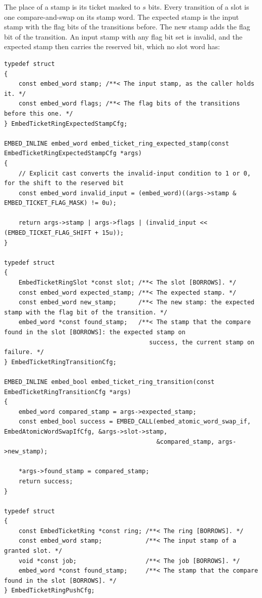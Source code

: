 The place of a stamp is its ticket masked to \(s\) bits. Every transition of a slot is one compare-and-swap on its stamp word. The expected stamp is the input stamp with the flag bits of the transitions before. The new stamp adds the flag bit of the transition. An input stamp with any flag bit set is invalid, and the expected stamp then carries the reserved bit, which no slot word has:

\begin{Verbatim}
typedef struct
{
    const embed_word stamp; /**< The input stamp, as the caller holds it. */
    const embed_word flags; /**< The flag bits of the transitions before this one. */
} EmbedTicketRingExpectedStampCfg;

EMBED_INLINE embed_word embed_ticket_ring_expected_stamp(const EmbedTicketRingExpectedStampCfg *args)
{
    // Explicit cast converts the invalid-input condition to 1 or 0, for the shift to the reserved bit
    const embed_word invalid_input = (embed_word)((args->stamp & EMBED_TICKET_FLAG_MASK) != 0u);

    return args->stamp | args->flags | (invalid_input << (EMBED_TICKET_FLAG_SHIFT + 15u));
}

typedef struct
{
    EmbedTicketRingSlot *const slot; /**< The slot [BORROWS]. */
    const embed_word expected_stamp; /**< The expected stamp. */
    const embed_word new_stamp;      /**< The new stamp: the expected stamp with the flag bit of the transition. */
    embed_word *const found_stamp;   /**< The stamp that the compare found in the slot [BORROWS]: the expected stamp on
                                        success, the current stamp on failure. */
} EmbedTicketRingTransitionCfg;

EMBED_INLINE embed_bool embed_ticket_ring_transition(const EmbedTicketRingTransitionCfg *args)
{
    embed_word compared_stamp = args->expected_stamp;
    const embed_bool success = EMBED_CALL(embed_atomic_word_swap_if, EmbedAtomicWordSwapIfCfg, &args->slot->stamp,
                                          &compared_stamp, args->new_stamp);

    *args->found_stamp = compared_stamp;
    return success;
}

typedef struct
{
    const EmbedTicketRing *const ring; /**< The ring [BORROWS]. */
    const embed_word stamp;            /**< The input stamp of a granted slot. */
    void *const job;                   /**< The job [BORROWS]. */
    embed_word *const found_stamp;     /**< The stamp that the compare found in the slot [BORROWS]. */
} EmbedTicketRingPushCfg;


\end{Verbatim}
